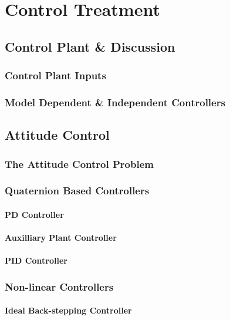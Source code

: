 \chapter{Control Treatment}
\label{ch:ch4}
\section*{Control Plant \& Discussion}
\subsection*{Control Plant Inputs}
\subsection*{Model Dependent \& Independent Controllers}

\section{Attitude Control}
\label{sec:ch4.attitude}
\subsection{The Attitude Control Problem}
\label{}
\subsection{Quaternion Based Controllers}
\subsubsection{PD Controller}
\subsubsection{Auxilliary Plant Controller}
\subsubsection{PID Controller}
\subsection{Non-linear Controllers}
\subsubsection{Ideal Back-stepping Controller}
